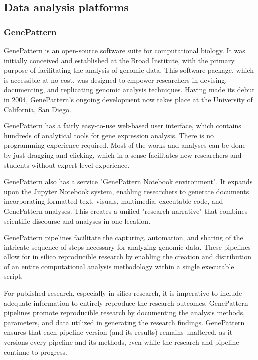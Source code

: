 \subsection{Data analysis platforms}
        \subsubsection{GenePattern}
            GenePattern is an open-source software suite for computational biology\cite{reich2006genepattern}. It was initially conceived and established at the Broad Institute, with the primary purpose of facilitating the analysis of genomic data. This software package, which is accessible at no cost, was designed to empower researchers in devising, documenting, and replicating genomic analysis techniques. Having made its debut in 2004, GenePattern's ongoing development now takes place at the University of California, San Diego.

            GenePattern has a fairly easy-to-use web-based user interface, which contains hundreds of analytical tools for gene expression analysis. There is no programming experience required. Most of the works and analyses can be done by just dragging and clicking, which in a sense facilitates new researchers and students without expert-level experience.

            GenePattern also has a service "GenePattern Notebook environment". It expands upon the Jupyter Notebook system, enabling researchers to generate documents incorporating formatted text, visuals, multimedia, executable code, and GenePattern analyses. This creates a unified "research narrative" that combines scientific discourse and analyses in one location.

            GenePattern pipelines facilitate the capturing, automation, and sharing of the intricate sequence of steps necessary for analyzing genomic data. These pipelines allow for in silico reproducible research by enabling the creation and distribution of an entire computational analysis methodology within a single executable script.
            
            For published research, especially in silico research, it is imperative to include adequate information to entirely reproduce the research outcomes. GenePattern pipelines promote reproducible research by documenting the analysis methods, parameters, and data utilized in generating the research findings. GenePattern ensures that each pipeline version (and its results) remains unaltered, as it versions every pipeline and its methods, even while the research and pipeline continue to progress.
            
